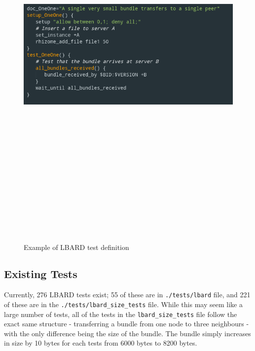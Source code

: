 \begin{figure}
    \begin{centering}
        \includegraphics[width=14cm,height=20cm,keepaspectratio]{Figures/testdefinitionexample.png}
        \caption{Example of LBARD test definition}
        \label{fig:testDefinition}
    \end{centering}
\end{figure}

\subsection{Existing Tests}
Currently, 276 LBARD tests exist; 55 of these are in \verb|./tests/lbard| file, and 221 of these are in the \verb|./tests/lbard_size_tests| file.
While this may seem like a large number of tests, all of the tests in the \verb|lbard_size_tests| file follow the exact same structure - transferring a bundle from one node to three neighbours - with the only difference being the size of the bundle.
The bundle simply increases in size by 10 bytes for each tests from 6000 bytes to 8200 bytes.

